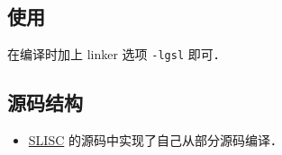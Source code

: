 \subsection{使用}
在编译时加上 linker 选项 \verb|-lgsl| 即可．

\subsection{源码结构}
\begin{itemize}
\item \href{https://github.com/MacroUniverse/SLISC}{SLISC} 的源码中实现了自己从部分源码编译．
\end{itemize}
